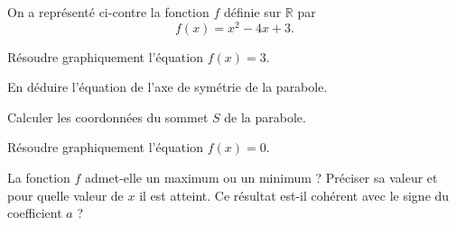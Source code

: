 \documentclass[11pt,a4paper]{article}  %
\begin{document}

	\begin{minipage}[c]{0.52\linewidth}
		On a représenté ci-contre la fonction $f$ définie sur $\mathbb{R}$ par
		$$f(x)=x^2-4x+3.$$
		\begin{enumMet}
			\item Résoudre graphiquement l'équation $f(x)=3$.
			\item En déduire l'équation de l'axe de symétrie de la parabole.
			\item Calculer les coordonnées du sommet $S$ de la parabole.
			\item Résoudre graphiquement l'équation $f(x)=0$.
			\item {} La fonction $f$ admet-elle un maximum ou un minimum ? Préciser sa valeur et pour quelle valeur de $x$ il est atteint. Ce résultat est-il cohérent avec le signe du coefficient $a$ ?
		\end{enumMet}
	\end{minipage} \hfill
	\begin{minipage}[c]{0.44\linewidth}
		\begin{center}
		\end{center}
	\end{minipage}

	\newpage

\end{document}
